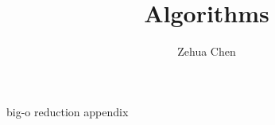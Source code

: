 \documentclass[letterpaper, 11pt]{report}
\title{Algorithms}
\author{Zehua Chen}
\begin{document}
  \maketitle
  \tableofcontents

  {big-o}
  {reduction}
  {appendix}
\end{document}
